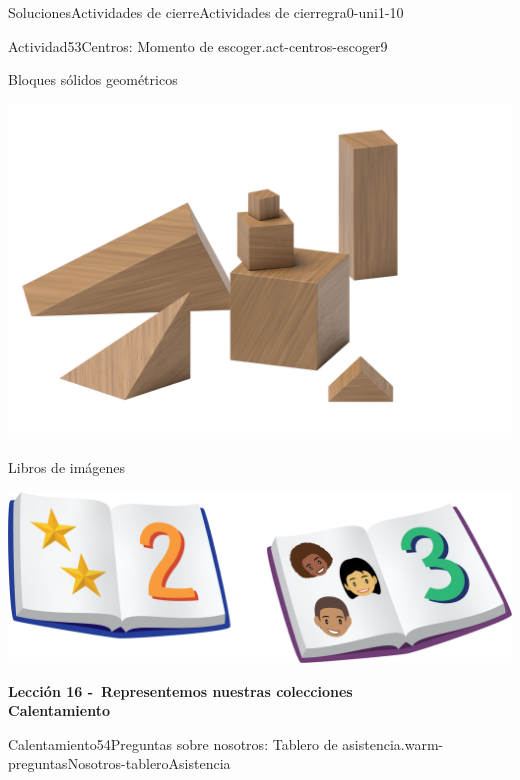 \documentclass[twoside,10pt,]{article}
\begin{document}
\begin{solutions-section}{Soluciones}{Actividades de cierre}{}{Actividades de cierre}{}{}{gra0-uni1-10}
\begin{activitysolution}{Actividad}{53}{Centros: Momento de escoger.}{act-centros-escoger9}
\begin{sidebyside}{2}{0.025}{0.025}{0.05}
\begin{sbspanel}{0.45}
\end{sbspanel}%
\end{sidebyside}%
\begin{sidebyside}{2}{0.025}{0.025}{0.05}%
\begin{sbspanel}{0.45}%
Bloques sólidos geométricos%
\par
\includegraphics[width=\linewidth]{external/png-source/K.1.A Beta Student Workbook.Geoblocks.png}
\end{sbspanel}%
\begin{sbspanel}{0.45}%
Libros de imágenes%
\par
\includegraphics[width=\linewidth]{external/png-source/K.1.D Beta Student Workbooks.Books.png}
\end{sbspanel}%
\end{sidebyside}%
\end{activitysolution}%
\par\medskip
\noindent\textbf{\large{}\space\textperiodcentered\space{}Lección 16 -~Representemos nuestras colecciones\\
\space\textperiodcentered\space{}Calentamiento}
\begin{explorationsolution}{Calentamiento}{54}{Preguntas sobre nosotros: Tablero de asistencia.}{warm-preguntasNosotros-tableroAsistencia}%

\end{explorationsolution}
\end{solutions-section}
\end{document}
